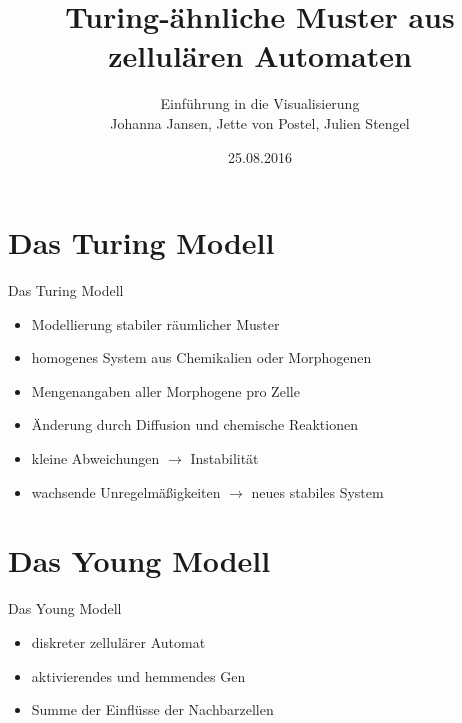\documentclass{beamer}
\title{Turing-\"ahnliche Muster aus zellul\"aren Automaten}
\author{Einf\"uhrung in die Visualisierung\\
	Johanna Jansen, Jette von Postel, Julien Stengel}
\date{25.08.2016}
\begin{document}
\begin{frame}
	
  \titlepage
  
\end{frame}

\section{Das Turing Modell}

\begin{frame}{Das Turing Modell}
	
\begin{itemize}

\item Modellierung stabiler r\"aumlicher Muster

\item homogenes System aus Chemikalien oder Morphogenen

\item Mengenangaben aller Morphogene pro Zelle

\item \"Anderung durch Diffusion und chemische Reaktionen

\item kleine Abweichungen $\rightarrow$ Instabilit\"at

\item wachsende Unregelm\"a\ss igkeiten $\rightarrow$ neues stabiles System

\end{itemize}

\end{frame}

\section{Das Young Modell}

\begin{frame}{Das Young Modell}

\begin{itemize}
	
	\item diskreter zellul\"arer Automat
	
	\item aktivierendes und hemmendes Gen
	
	\item Summe der Einfl\"usse der Nachbarzellen
	
\end{itemize}

\end{frame}
\end{document}
